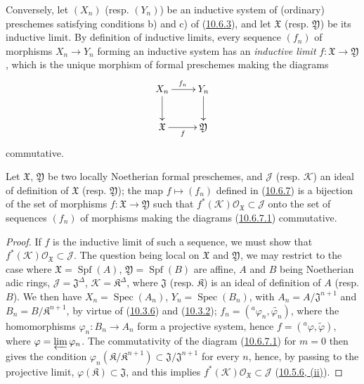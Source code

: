 \begin{env}[10.6.8]
\label{I.10.6.8}
Conversely, let $(X_n)$ (resp. $(Y_n)$) be an inductive system of
(ordinary) preschemes satisfying conditions b) and c) of
(\hyperref[I.10.6.3]{10.6.3}), and let $\mathfrak{X}$ (resp.
$\mathfrak{Y}$) be its inductive limit. By definition of inductive
limits, every sequence $(f_n)$ of morphisms $X_n\to Y_n$ forming an
inductive system has an \emph{inductive limit}
$f:\mathfrak{X}\to\mathfrak{Y}$, which is the unique morphism of
formal preschemes making the diagrams
\[
  \xymatrix{
    X_n\ar[r]^{f_n}\ar[d] &
    Y_n\ar[d]\\
    \mathfrak{X}\ar[r]_f &
    \mathfrak{Y}
  }
\]
commutative.
\end{env}

\begin{proposition}[10.6.9]
\label{I.10.6.9}
Let $\mathfrak{X}$, $\mathfrak{Y}$ be two locally Noetherian formal
preschemes, and $\mathscr{J}$ (resp. $\mathscr{K}$) an ideal
of definition of $\mathfrak{X}$ (resp. $\mathfrak{Y}$);
the map $f\mapsto(f_n)$ defined in
(\hyperref[I.10.6.7]{10.6.7}) is a bijection of the set of
morphisms $f:\mathfrak{X}\to\mathfrak{Y}$ such that
$f^*(\mathscr{K})\mathscr{O}_{\mathfrak{X}}\subset\mathscr{J}$ onto
the set of sequences $(f_n)$ of morphisms making the
diagrams (\hyperref[I.10.6.7.1]{10.6.7.1}) commutative.
\end{proposition}

\begin{proof}
If $f$ is the inductive limit of such a sequence, we must show that
$f^*(\mathscr{K})\mathscr{O}_{\mathfrak{X}}\subset\mathscr{J}$. The
question being local on $\mathfrak{X}$ and $\mathfrak{Y}$, we may
restrict to the case where $\mathfrak{X}=\operatorname{Spf}(A)$,
$\mathfrak{Y}=\operatorname{Spf}(B)$ are affine, $A$ and $B$ being
Noetherian adic rings,
$\mathscr{J}=\mathfrak{J}^\Delta$,
$\mathscr{K}=\mathfrak{K}^\Delta$, where $\mathfrak{J}$ (resp.
$\mathfrak{K}$) is an ideal of definition of $A$ (resp. $B$). We then
have $X_n=\operatorname{Spec}(A_n)$,
$Y_n=\operatorname{Spec}(B_n)$, with
$A_n=A/\mathfrak{J}^{n+1}$ and $B_n=B/\mathfrak{K}^{n+1}$, by virtue of
(\hyperref[I.10.3.6]{10.3.6}) and
(\hyperref[I.10.3.2]{10.3.2});
$f_n=({}^a\varphi_n,\widetilde{\varphi_n})$, where the homomorphisms
$\varphi_n:B_n\to A_n$ form a projective system, hence
$f=({}^a\varphi,\widetilde{\varphi})$, where
$\varphi=\varprojlim\varphi_n$. The commutativity of the diagram
(\hyperref[I.10.6.7.1]{10.6.7.1}) for $m=0$ then gives the
condition
$\varphi_n(\mathfrak{K}/\mathfrak{K}^{n+1})
\subset\mathfrak{J}/\mathfrak{J}^{n+1}$ for every $n$, hence, by
passing to the projective limit, $\varphi(\mathfrak{K})\subset
\mathfrak{J}$, and this implies
$f^*(\mathscr{K})\mathscr{O}_{\mathfrak{X}}\subset\mathscr{J}$
(\hyperref[I.10.5.6]{10.5.6, (ii)}).
\end{proof}


